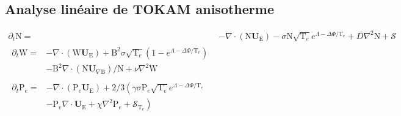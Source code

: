\label{Annexe C}
\begin{refsection}

\section{Analyse linéaire de TOKAM anisotherme}
\begin{align}
\label{2-eqContinuiteTemp}
\partial_t \text{N}
=& - \nabla\cdot\left(\text{N}\mathbf U_\text{E}\right) -\sigma
\text{N}\sqrt{\text{T}_e}e^{\Lambda-\Delta\Phi/\text{T}_e} + D\nabla^2 \text{N}
+ \mathcal{S}
\\[0.5cm]
\label{2-eqCourantTemp}
\begin{split}
\partial_{t}\text{W} =& 
-\nabla\cdot\left(\text{W}\mathbf U_\text{E}\right)
+\text{B}^2\sigma\sqrt{\text{T}_e}\left(1-e^{\Lambda-\Delta\Phi/\text{T}_e}\right)\\
&-\text{B}^2\nabla\cdot\left(\text{N}\mathbf
U_{\nabla\text{B}}\right)/\text{N} +\nu\nabla^2\text{W}
\end{split}
\\[0.5cm]
\label{2-eqEnergyTemp}
\begin{split}
\partial_{t}\text{P}_e=&
-\nabla\cdot\left(\text{P}_e\mathbf U_\text{E}\right)
+2/3\left(\gamma\sigma\text{P}_e\sqrt{\text{T}_e}e^{\Lambda-\Delta\Phi/\text{T}_e}\right.\\
&\left.-\text{P}_e\nabla\cdot\mathbf U_\text{E}
+\chi\nabla^2\text{P}_e
+\mathcal{S}_{\text{T}_e}\right)
\end{split}
\end{align}
\end{refsection}
